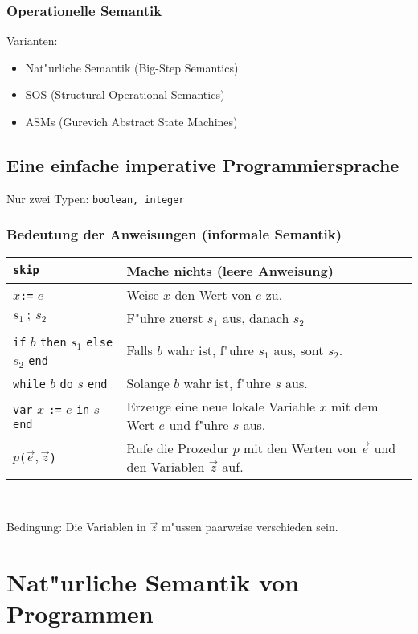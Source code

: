 \documentclass[german,10pt, a4paper, twocolumn]{scrartcl}
\theoremstyle{definition}
\theoremstyle{remark}
\begin{document}
\subsubsection{Operationelle Semantik}

Varianten:
\begin{itemize}
	\item Nat"urliche Semantik (Big-Step Semantics)
	\item SOS (Structural Operational Semantics)
	\item ASMs (Gurevich Abstract State Machines)
\end{itemize}

\subsection{Eine einfache imperative Programmiersprache}

Nur zwei Typen: \verb#boolean, integer#

\subsubsection{Bedeutung der Anweisungen (informale Semantik)}

\small
\begin{tabular}{|l|p{4cm}|}
	\hline
	\verb#skip# &		Mache nichts (leere Anweisung) \\ \hline
	$x$\verb#:=# $e$ &	Weise $x$ den Wert von $e$ zu. \\ \hline
	$s_1\ ;\ s_2$ &		F"uhre zuerst $s_1$ aus, danach $s_2$ \\ \hline
	\verb#if# $b$ \verb#then# $s_1$ \verb#else# $s_2$ \verb#end# &	Falls $b$ wahr ist, f"uhre $s_1$ aus, sont $s_2$.\\ \hline
	\verb#while# $b$ \verb#do# $s$ \verb#end# &	Solange $b$ wahr ist, f"uhre $s$ aus. \\ \hline
	\verb#var# $x$ \verb#:=# $e$ \verb#in# $s$ \verb#end# &		Erzeuge eine neue lokale Variable $x$ mit dem Wert $e$ und f"uhre $s$ aus.\\ \hline
	$p$\verb#(#$\vec{e},\vec{z}$\verb#)# &		Rufe die Prozedur $p$ mit den Werten von $\vec{e}$ und den Variablen $\vec{z}$ auf.\\ \hline
\end{tabular}\\
\normalsize

Bedingung: Die Variablen in $\vec{z}$ m"ussen paarweise verschieden sein.

\section{Nat"urliche Semantik von Programmen}
\end{document}
